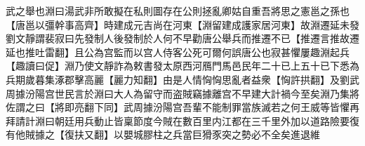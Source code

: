 武之舉也淵曰湯武非所敢擬在私則圖存在公則拯亂卿姑自重吾將思之憲邕之孫也【唐邕以彊幹事高齊】時建成元吉尚在河東【淵留建成護家居河東】故淵遷延未發劉文靜謂裴寂曰先發制人後發制於人何不早勸唐公舉兵而推遷不已【推遷言推故遷延也推吐雷翻】且公為宫監而以宫人侍客公死可爾何誤唐公也寂甚懼屢趣淵起兵【趣讀曰促】淵乃使文靜詐為敕書發太原西河鴈門馬邑民年二十已上五十已下悉為兵期歲暮集涿郡擊高麗【麗力知翻】由是人情恟恟思亂者益衆【恟許拱翻】及劉武周據汾陽宫世民言於淵曰大人為留守而盗賊竊據離宫不早建大計禍今至矣淵乃集將佐謂之曰【將即亮翻下同】武周據汾陽宫吾輩不能制罪當族滅若之何王威等皆懼再拜請計淵曰朝廷用兵動止皆稟節度今賊在數百里内江都在三千里外加以道路險要復有他賊據之【復扶又翻】以嬰城膠柱之兵當巨猾豕突之勢必不全矣進退維